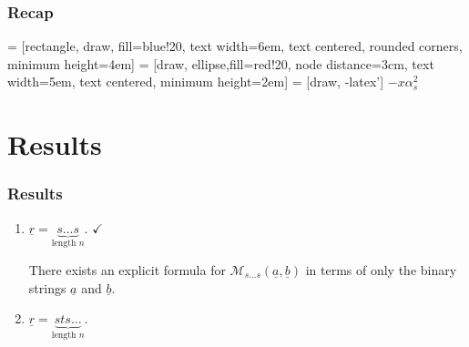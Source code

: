 \documentclass[pdf]{beamer}
\def\ii{\item}
\def\ul#1{\underline{#1}}
\def\MM{\mathcal M}
\begin{document}
\begin{frame}
	\frametitle{Recap}
	 = [rectangle, draw, fill=blue!20, text width=6em, text centered, rounded corners, minimum height=4em]
	 = [draw, ellipse,fill=red!20, node distance=3cm, text width=5em, text centered, minimum height=2em]
	 = [draw, -latex']
	\pause
	\hspace*{0.7\textwidth} $-x\alpha_s^2$

\end{frame}

\section{Results}
\begin{frame}
	\frametitle{Results}
	\begin{enumerate}
	\ii $\ul r = \underbrace{s\dots s}_{\text{length $n$}}$. \pause $\checkmark$
	\begin{theorem}
		There exists an explicit formula for $\MM_{s\dots s}(\ul a, \ul b)$ in terms of only the binary strings $\ul a$ and $\ul b$.
	\end{theorem}
	\pause
	\ii $\ul r = \underbrace{sts\dots}_{\text{length $n$}}$.
	\end{enumerate}
\end{frame}
\end{document}
